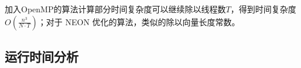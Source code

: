 \documentclass[a4paper]{article}
\begin{document}
加入OpenMP的算法计算部分时间复杂度可以继续除以线程数$T$，得到时间复杂度$O(\frac{n^3}{N \cdot T})$；对于 NEON 优化的算法，类似的除以向量长度常数。

\subsection{运行时间分析}



% 
% 
\end{document}
